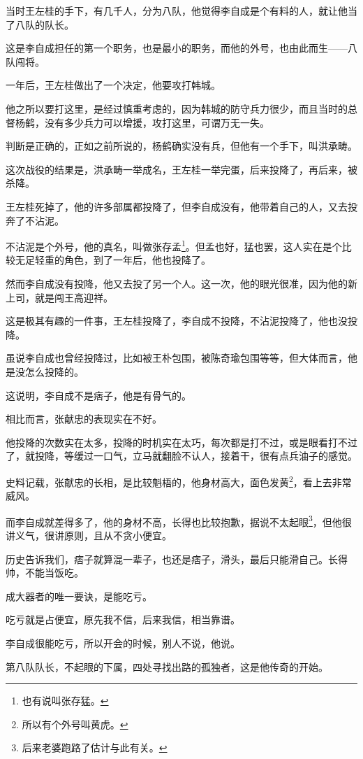 \begin{multicols}{\theparacolNo}
		当时王左桂的手下，有几千人，分为八队，他觉得李自成是个有料的人，就让他当了八队的队长。

		这是李自成担任的第一个职务，也是最小的职务，而他的外号，也由此而生——八队闯将。

		一年后，王左桂做出了一个决定，他要攻打韩城。

		他之所以要打这里，是经过慎重考虑的，因为韩城的防守兵力很少，而且当时的总督杨鹤，没有多少兵力可以增援，攻打这里，可谓万无一失。

		判断是正确的，正如之前所说的，杨鹤确实没有兵，但他有一个手下，叫洪承畴。

		这次战役的结果是，洪承畴一举成名，王左桂一举完蛋，后来投降了，再后来，被杀降。

		王左桂死掉了，他的许多部属都投降了，但李自成没有，他带着自己的人，又去投奔了不沾泥。

		不沾泥是个外号，他的真名，叫做张存孟\footnote{也有说叫张存猛。}。但孟也好，猛也罢，这人实在是个比较无足轻重的角色，到了一年后，他也投降了。

		然而李自成没有投降，他又去投了另一个人。这一次，他的眼光很准，因为他的新上司，就是闯王高迎祥。

		这是极其有趣的一件事，王左桂投降了，李自成不投降，不沾泥投降了，他也没投降。

		虽说李自成也曾经投降过，比如被王朴包围，被陈奇瑜包围等等，但大体而言，他是没怎么投降的。

		这说明，李自成不是痞子，他是有骨气的。

		相比而言，张献忠的表现实在不好。

		他投降的次数实在太多，投降的时机实在太巧，每次都是打不过，或是眼看打不过了，就投降，等缓过一口气，立马就翻脸不认人，接着干，很有点兵油子的感觉。

		史料记载，张献忠的长相，是比较魁梧的，他身材高大，面色发黄\footnote{所以有个外号叫黄虎。}，看上去非常威风。

		而李自成就差得多了，他的身材不高，长得也比较抱歉，据说不太起眼\footnote{后来老婆跑路了估计与此有关。}，但他很讲义气，很讲原则，且从不贪小便宜。

		历史告诉我们，痞子就算混一辈子，也还是痞子，滑头，最后只能滑自己。长得帅，不能当饭吃。

		成大器者的唯一要诀，是能吃亏。

		吃亏就是占便宜，原先我不信，后来我信，相当靠谱。

		李自成很能吃亏，所以开会的时候，别人不说，他说。

		第八队队长，不起眼的下属，四处寻找出路的孤独者，这是他传奇的开始。


\end{multicols}
